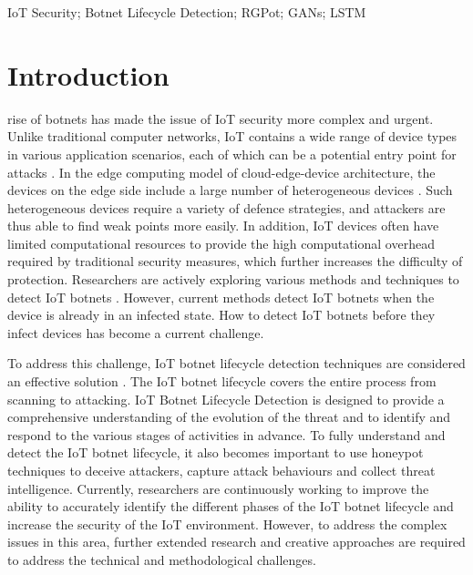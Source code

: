 \documentclass[journal]{IEEEtai}
\begin{document}
\begin{IEEEkeywords}
IoT Security; Botnet Lifecycle Detection; RGPot; GANs; LSTM

\end{IEEEkeywords}



\section{Introduction}
\label{Introduction}

 rise of botnets has made the issue of IoT security more complex and urgent.
Unlike traditional computer networks, IoT contains a wide range of device types in various application scenarios, each of which can be a potential entry point for attacks \cite{280016}. 
In the edge computing model of cloud-edge-device architecture, the devices on the edge side include a large number of heterogeneous devices \cite{9645169}.
Such heterogeneous devices require a variety of defence strategies, and attackers are thus able to find weak points more easily.
In addition, IoT devices often have limited computational resources to provide the high computational overhead required by traditional security measures, which further increases the difficulty of protection.
Researchers are actively exploring various methods and techniques to detect IoT botnets \cite{9438691}.
However, current methods detect IoT botnets when the device is already in an infected state.
How to detect IoT botnets before they infect devices has become a current challenge.

To address this challenge, IoT botnet lifecycle detection techniques are considered an effective solution \cite{272224}.
The IoT botnet lifecycle covers the entire process from scanning to attacking.
IoT Botnet Lifecycle Detection is designed to provide a comprehensive understanding of the evolution of the threat and to identify and respond to the various stages of activities in advance.
To fully understand and detect the IoT botnet lifecycle, it also becomes important to use honeypot techniques to deceive attackers, capture attack behaviours and collect threat intelligence.
Currently, researchers are continuously working to improve the ability to accurately identify the different phases of the IoT botnet lifecycle and increase the security of the IoT environment.
However, to address the complex issues in this area, further extended research and creative approaches are required to address the technical and methodological challenges.
\end{document}

